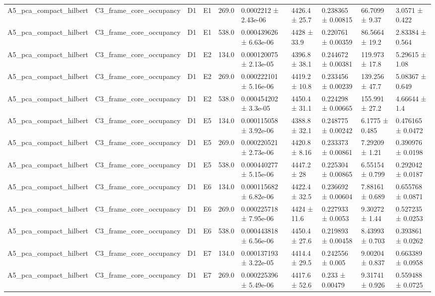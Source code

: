 \begin{table}
\begin{tabular}{llllllllll}
A5\_pca\_compact\_hilbert & C3\_frame\_core\_occupancy & D1 & E1 & 269.0 & 0.0002212 ± 2.43e-06 & 4426.4 ± 25.7 & 0.238365 ± 0.00815 & 66.7099 ± 9.37 & 3.0571 ± 0.422 \\
A5\_pca\_compact\_hilbert & C3\_frame\_core\_occupancy & D1 & E1 & 538.0 & 0.000439626 ± 6.63e-06 & 4428 ± 33.9 & 0.220761 ± 0.00359 & 86.5664 ± 19.2 & 2.83384 ± 0.564 \\
A5\_pca\_compact\_hilbert & C3\_frame\_core\_occupancy & D1 & E2 & 134.0 & 0.000120075 ± 2.13e-05 & 4396.8 ± 38.1 & 0.244672 ± 0.00381 & 119.973 ± 17.8 & 5.29615 ± 1.08 \\
A5\_pca\_compact\_hilbert & C3\_frame\_core\_occupancy & D1 & E2 & 269.0 & 0.000222101 ± 5.16e-06 & 4419.2 ± 10.8 & 0.233456 ± 0.00239 & 139.256 ± 47.7 & 5.08367 ± 0.649 \\
A5\_pca\_compact\_hilbert & C3\_frame\_core\_occupancy & D1 & E2 & 538.0 & 0.000454202 ± 3.3e-05 & 4450.4 ± 31.1 & 0.224298 ± 0.00665 & 155.991 ± 27.2 & 4.66644 ± 1.4 \\
A5\_pca\_compact\_hilbert & C3\_frame\_core\_occupancy & D1 & E5 & 134.0 & 0.000115058 ± 3.92e-06 & 4388.8 ± 32.1 & 0.248775 ± 0.00242 & 6.1775 ± 0.485 & 0.476165 ± 0.0472 \\
A5\_pca\_compact\_hilbert & C3\_frame\_core\_occupancy & D1 & E5 & 269.0 & 0.000220521 ± 2.73e-06 & 4420.8 ± 8.16 & 0.233373 ± 0.00861 & 7.29209 ± 1.21 & 0.390976 ± 0.0198 \\
A5\_pca\_compact\_hilbert & C3\_frame\_core\_occupancy & D1 & E5 & 538.0 & 0.000440277 ± 5.15e-06 & 4447.2 ± 28 & 0.225304 ± 0.00865 & 6.55154 ± 0.799 & 0.292042 ± 0.0187 \\
A5\_pca\_compact\_hilbert & C3\_frame\_core\_occupancy & D1 & E6 & 134.0 & 0.000115682 ± 6.82e-06 & 4422.4 ± 32.5 & 0.236692 ± 0.00604 & 7.88161 ± 0.689 & 0.655768 ± 0.0871 \\
A5\_pca\_compact\_hilbert & C3\_frame\_core\_occupancy & D1 & E6 & 269.0 & 0.000225718 ± 7.95e-06 & 4424 ± 11.6 & 0.227933 ± 0.0053 & 9.30272 ± 1.44 & 0.527235 ± 0.0253 \\
A5\_pca\_compact\_hilbert & C3\_frame\_core\_occupancy & D1 & E6 & 538.0 & 0.000443818 ± 6.56e-06 & 4450.4 ± 27.6 & 0.219893 ± 0.00458 & 8.43993 ± 0.703 & 0.393861 ± 0.0262 \\
A5\_pca\_compact\_hilbert & C3\_frame\_core\_occupancy & D1 & E7 & 134.0 & 0.000137193 ± 3.22e-05 & 4414.4 ± 29.5 & 0.242556 ± 0.005 & 9.00204 ± 0.837 & 0.663389 ± 0.0958 \\
A5\_pca\_compact\_hilbert & C3\_frame\_core\_occupancy & D1 & E7 & 269.0 & 0.000225396 ± 5.49e-06 & 4417.6 ± 52.6 & 0.233 ± 0.00479 & 9.31741 ± 0.926 & 0.559488 ± 0.0725 \\

\end{tabular}
\end{table}
